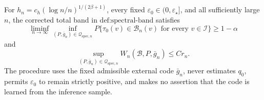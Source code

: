 For \(h_n=c_h(\log n/n)^{1/(2\beta+1)}\), every fixed \(\varepsilon_0\in(0,\varepsilon_\star]\), and all sufficiently large \(n\), the corrected total band in \(\text{def:spectral-band}\) satisfies
\[
 \liminf_{n\to\infty}\inf_{(P,\bar g_n)\in\mathcal Q_{\mathrm{spec},n}}P\{\tau_0(v)\in\mathcal B_n(v)\text{ for every }v\in\mathcal I\}\ge1-\alpha
\]
and
\[
 \sup_{(P,\bar g_n)\in\mathcal Q_{\mathrm{spec},n}}W_n(\mathcal B,P,\bar g_n)\le Cr_n.
\]
The procedure uses the fixed admissible external code \(\bar g_n\), never estimates \(q_0\), permits \(\varepsilon_0\) to remain strictly positive, and makes no assertion that the code is learned from the inference sample.